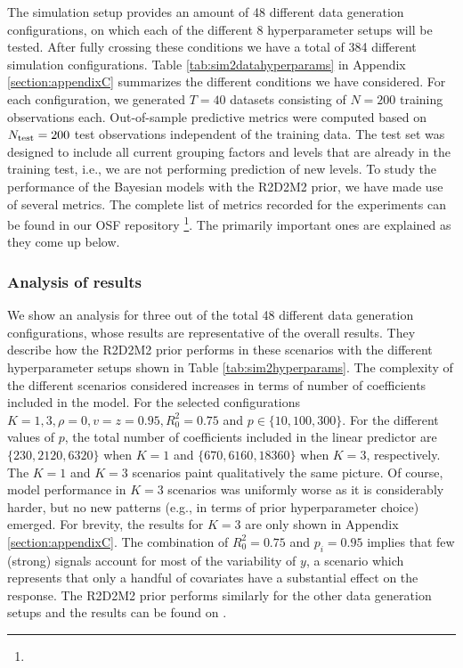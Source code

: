 The simulation setup provides an amount of 48 different data generation configurations, on which each of the different 8 hyperparameter setups will be tested. After fully crossing these conditions we have a total of 384 different simulation configurations. Table \ref{tab:sim2datahyperparams} in Appendix \ref{section:appendixC} summarizes the different conditions we have considered. For each configuration, we generated $T = 40$ datasets consisting of $N = 200$ training observations each. Out-of-sample predictive metrics were computed based on $N_{\rm test} = 200$ test observations independent of the training data. The test set was designed to include all current grouping factors and levels that are already in the training test, i.e., we are not performing prediction of new levels. To study the performance of the Bayesian models with the R2D2M2 prior, we have made use of several metrics. The complete list of metrics recorded for the experiments can be found in our OSF repository \footnote{\myosfresults}. The primarily important ones are explained as they come up below.

\subsubsection{Analysis of results}
\label{subsubsection:analysis}
We show an analysis for three out of the total 48 different data generation configurations, whose results are representative of the overall results. They describe how the R2D2M2 prior performs in these scenarios with the different hyperparameter setups shown in Table \ref{tab:sim2hyperparams}. The complexity of the different scenarios considered increases in terms of number of coefficients included in the model. For the selected configurations $K=1,3, \rho=0, v=z=0.95, R^2_0= 0.75$ and $p \in \{10,100,300 \}$. For the different values of $p$, the total number of coefficients included in the linear predictor are  $\{230, 2120, 6320\}$ when $K=1$ and $\{670, 6160, 18360\}$ when $K=3$, respectively. The $K=1$ and $K=3$ scenarios paint qualitatively the same picture. Of course, model performance in $K=3$ scenarios was uniformly worse as it is considerably harder, but no new patterns (e.g., in terms of prior hyperparameter choice) emerged. For brevity, the results for $K=3$ are only shown in Appendix \ref{section:appendixC}. The combination of $R^2_0=0.75$ and $p_i=0.95$ implies that  few (strong) signals account for most of the variability of $y$, a scenario which represents that only a handful of covariates have a substantial effect on the response. The R2D2M2 prior performs similarly for the other data generation setups and the results can be found on {\myosfresults}.

